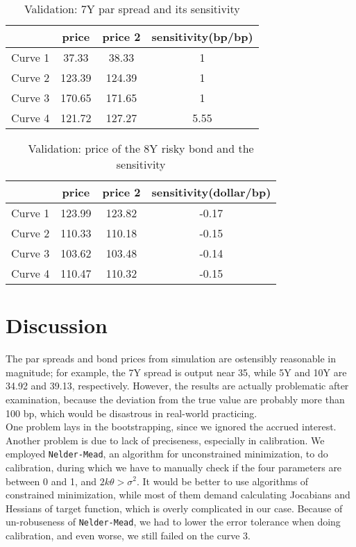 \documentclass[a4paper,twoside,10pt]{report}
\begin{document}
\begin{table}[h!]
\centering
\begin{tabular}{ |c|c|c|c| } 
 \hline
					 & price & price 2 &sensitivity(bp/bp)\\ 
 \hline
	Curve 1  & 37.33 	&	38.33 & 1\\ 
 \hline
  Curve 2  & 123.39  &	124.39 & 1\\ 
 \hline
	Curve 3  & 170.65	& 171.65 & 1\\ 
 \hline
	Curve 4  & 121.72 & 127.27	& 5.55\\ 
 \hline
\end{tabular}
\caption{Validation: 7Y par spread and its sensitivity}
\label{v7y}
\end{table}

\begin{table}[h!]
\centering
\begin{tabular}{ |c|c|c|c| } 
 \hline
					 & price & price 2 &sensitivity(dollar/bp)\\ 
 \hline
	Curve 1  & 123.99 	&	123.82 & -0.17\\ 
 \hline
  Curve 2  & 110.33  &	110.18 & -0.15\\ 
 \hline
	Curve 3  & 103.62	& 103.48 & -0.14 \\ 
 \hline
	Curve 4  & 110.47 & 110.32	& -0.15\\ 
 \hline
\end{tabular}
\caption{Validation: price of the 8Y risky bond and the sensitivity}
\label{v_risky}
\end{table}


\chapter{Discussion}
The par spreads and bond prices from simulation are ostensibly reasonable in magnitude; for example, the 7Y spread is output near 35, while 5Y and 10Y are 34.92 and 39.13, respectively. However, the results are actually problematic after examination, because the deviation from the true value are probably more than 100 bp, which would be disastrous in real-world practicing. \\
One problem lays in the bootstrapping, since we ignored the accrued interest. Another problem is due to lack of preciseness, especially in calibration. We employed \texttt{Nelder-Mead}, an algorithm for unconstrained minimization, to do calibration, during which we have to manually check if the four parameters are between 0 and 1, and $2 k \theta > \sigma^2$. It would be better to use algorithms of constrained minimization, while most of them demand calculating Jocabians and Hessians of target function, which is overly complicated in our case. Because of un-robuseness of \texttt{Nelder-Mead}, we had to lower the error tolerance when doing calibration, and even worse, we still failed on the curve 3.
\end{document}
